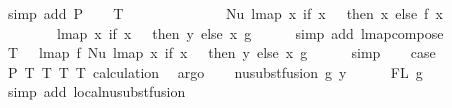 \begin{isabellebody}
\ {\isacharparenleft}{\kern0pt}simp\ add{\isacharcolon}{\kern0pt}\ P{}{\isacharparenright}{\kern0pt}\isanewline
\ \ \isamarkupfalse%
\ T{}{\isacharcolon}{\kern0pt}\ {\isachardoublequoteopen}{\isachardot}{\kern0pt}{\isachardot}{\kern0pt}{\isachardot}{\kern0pt}\ {\isacharequal}{\kern0pt}\isanewline
\ \ \ \ \ \ \ \ \ \ \ \ Nu\ {\isacharparenleft}{\kern0pt}lmap\ {\isacharparenleft}{\kern0pt}{\isasymlambda}x{\isachardot}{\kern0pt}\ if\ x\ {\isacharequal}{\kern0pt}\ {}\ then\ x\ else\ f\ {\isacharparenleft}{\kern0pt}x\ {\isacharminus}{\kern0pt}\ {}{\isacharparenright}{\kern0pt}\ {\isacharplus}{\kern0pt}\ {}{\isacharparenright}{\kern0pt}\isanewline
\ \ \ \ \ \ \ \ {\isacharparenleft}{\kern0pt}lmap\ {\isacharparenleft}{\kern0pt}{\isasymlambda}x{\isachardot}{\kern0pt}\ if\ x\ {\isacharequal}{\kern0pt}\ {}\ then\ y\ else\ x{\isacharparenright}{\kern0pt}\ g{\isacharparenright}{\kern0pt}{\isacharparenright}{\kern0pt}{\isachardoublequoteclose}\isanewline
\ \ \ \ \isamarkupfalse%
\ {\isacharparenleft}{\kern0pt}simp\ add{\isacharcolon}{\kern0pt}\ lmap{\isacharunderscore}{\kern0pt}compose{\isacharparenright}{\kern0pt}\isanewline
\ \ \isamarkupfalse%
\ T{}{\isacharcolon}{\kern0pt}\ {\isachardoublequoteopen}{\isachardot}{\kern0pt}{\isachardot}{\kern0pt}{\isachardot}{\kern0pt}\ {\isacharequal}{\kern0pt}\ lmap\ f\ {\isacharparenleft}{\kern0pt}Nu\ {\isacharparenleft}{\kern0pt}lmap\ {\isacharparenleft}{\kern0pt}{\isasymlambda}x{\isachardot}{\kern0pt}\ if\ x\ {\isacharequal}{\kern0pt}\ {}\ then\ y\ else\ x{\isacharparenright}{\kern0pt}\ g{\isacharparenright}{\kern0pt}{\isacharparenright}{\kern0pt}{\isachardoublequoteclose}\isanewline
\ \ \ \ \isamarkupfalse%
\ simp\isanewline
\ \ \isamarkupfalse%
\ {\isacharquery}{\kern0pt}case\isanewline
\ \ \ \ \isamarkupfalse%
\ P{}\ T{}\ T{}\ T{}\ T{}\ calculation\ \isamarkupfalse%
\ argo\isanewline
{}\isamarkupfalse%
\isanewline
\ \ \isamarkupfalse%
\ {\isacharparenleft}{\kern0pt}nu{\isacharunderscore}{\kern0pt}subst{\isacharunderscore}{\kern0pt}fusion{}\ g\ y{\isacharparenright}{\kern0pt}\isanewline
\ \ \isamarkupfalse%
\ {\isachardoublequoteopen}{}\ {\isasymin}\ FL\ g{\isachardoublequoteclose}\isanewline
\ \ \ \ \isamarkupfalse%
\ {\isacharparenleft}{\kern0pt}simp\ add{\isacharcolon}{\kern0pt}\ local{\isachardot}{\kern0pt}nu{\isacharunderscore}{\kern0pt}subst{\isacharunderscore}{\kern0pt}fusion{}{\isacharparenright}{\kern0pt}\isanewline

\end{isabellebody}

